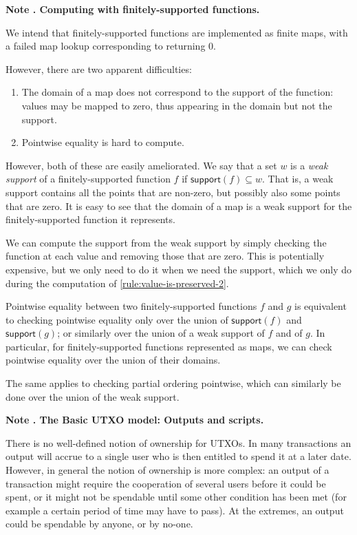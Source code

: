 \documentclass[a4paper]{article}
\newcounter{note}
\newcommand{\note}[1]{
  \bigskip
  \refstepcounter{note}
  \noindent\textbf{Note \thenote. #1}
}
\newcommand{\msf}[1]{\ensuremath{\mathsf{#1}}}
\newcommand{\support}{\msf{support}}
\begin{document}
\note{Computing with finitely-supported functions.}
\label{note:finitely-supported-functions}
We intend that finitely-supported functions are implemented as finite
maps, with a failed map lookup corresponding to returning 0.

However, there are two apparent difficulties:
\begin{enumerate}
  \item The domain of a map does not correspond to the support of the function:
    values may be mapped to zero, thus appearing in the domain but not the support.
  \item Pointwise equality is hard to compute.
\end{enumerate}

However, both of these are easily ameliorated. We say that a set $w$ is a \textit{weak support}
of a finitely-supported function $f$ if $\support(f) \subseteq w$. That is, a
weak support contains all the points that are non-zero, but possibly also some
points that are zero. It is easy to see that the domain of a map is a weak
support for the finitely-supported function it represents.

We can compute the support from the weak support by simply checking the function
at each value and removing those that are zero. This is potentially expensive,
but we only need to do it when we need the support, which we only do during the
computation of \cref{rule:value-is-preserved-2}.

Pointwise equality between two finitely-supported functions $f$ and $g$ is
equivalent to checking pointwise equality only over the union of $\support(f)$
and $\support(g)$; or similarly over the union of a weak support of $f$ and of
$g$. In particular, for finitely-supported functions represented as maps, we can
check pointwise equality over the union of their domains.

The same applies to checking partial ordering pointwise, which can similarly
be done over the union of the weak support.

\note{The Basic UTXO model: Outputs and scripts.}
\label{note:basic-utxo}
There is no well-defined notion of ownership for UTXOs.  In many
transactions an output will accrue to a single user who is then
entitled to spend it at a later date.  However, in general the notion
of ownership is more complex: an output of a transaction might require
the cooperation of several users before it could be spent, or it might
not be spendable until some other condition has been met (for example
a certain period of time may have to pass).  At the extremes, an
output could be spendable by anyone, or by no-one.
\end{document}
